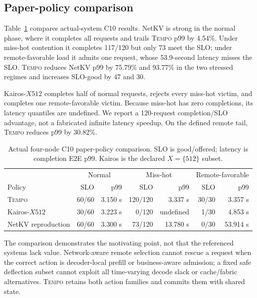 \documentclass[10pt,twocolumn]{article}
\newcommand{\system}{\textsc{Tempo}\xspace}
\begin{document}
\subsection{Paper-policy comparison}

Table~\ref{tab:sota} compares actual-system C10 results.  NetKV is strong in the
normal phase, where it completes all requests and trails \system p99 by 4.54\%.
Under miss-hot contention it completes 117/120 but only 73 meet the SLO; under
remote-favorable load it admits one request, whose 53.9-second latency misses
the SLO.  \system reduces NetKV p99 by 75.79\% and 93.77\% in the two stressed
regimes and increases SLO-good by 47 and 30.

Kairos-$X512$ completes half of normal requests, rejects every miss-hot victim,
and completes one remote-favorable victim.  Because miss-hot has zero
completions, its latency quantiles are undefined.  We report a 120-request
completion/SLO advantage, not a fabricated infinite latency speedup.  On the
defined remote tail, \system reduces p99 by 30.82\%.

\begin{table}[t]
\centering
\caption{Actual four-node C10 paper-policy comparison.  SLO is good/offered;
latency is completion E2E p99.  Kairos is the declared $X=\{512\}$ subset.}
\label{tab:sota}
\small
\begin{tabular}{lrrrrrr}
\toprule
& \multicolumn{2}{c}{Normal} & \multicolumn{2}{c}{Miss-hot}
& \multicolumn{2}{c}{Remote-favorable} \\
Policy & SLO & p99 & SLO & p99 & SLO & p99 \\
\midrule
\system & 60/60 & 3.150 s & 120/120 & 3.337 s & 30/30 & 3.357 s \\
Kairos-$X512$ & 30/60 & 3.223 s & 0/120 & undefined & 1/30 & 4.853 s \\
NetKV reproduction & 60/60 & 3.300 s & 73/120 & 13.780 s & 0/30 & 53.914 s \\
\bottomrule
\end{tabular}
\end{table}

The comparison demonstrates the motivating point, not that the referenced
systems lack value.  Network-aware remote selection cannot rescue a request
when the correct action is decoder-local prefill or business-aware admission;
a fixed safe deflection subset cannot exploit all time-varying decode slack or
cache/fabric alternatives.  \system retains both action families and commits
them with shared state.
\end{document}

